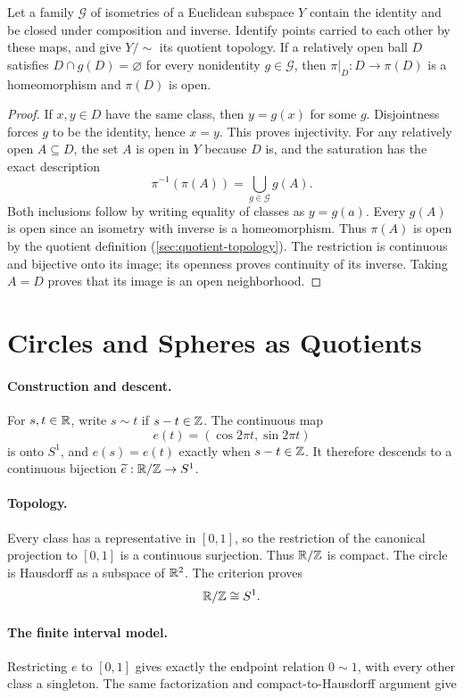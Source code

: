 \begin{lemma}
\label{lem:separated-quotient-neighborhood}
Let a family $\mathcal G$ of isometries of a Euclidean subspace $Y$
contain the identity and be closed under composition and inverse. Identify
points carried to each other by these maps, and give $Y/{\sim}$ its
quotient topology. If a relatively open ball $D$ satisfies
$D\cap g(D)=\varnothing$ for every nonidentity $g\in\mathcal G$, then
$\pi|_D:D\to\pi(D)$ is a homeomorphism and $\pi(D)$ is open.
\end{lemma}
\begin{proof}
If $x,y\in D$ have the same class, then $y=g(x)$ for some $g$.
Disjointness forces $g$ to be the identity, hence $x=y$. This proves
injectivity. For any relatively open $A\subseteq D$, the set $A$ is
open in $Y$ because $D$ is, and the saturation has the exact description
\[
\pi^{-1}(\pi(A))=\bigcup_{g\in\mathcal G}g(A).
\]
Both inclusions follow by writing equality of classes as $y=g(a)$.
Every $g(A)$ is open since an isometry with inverse is a homeomorphism.
Thus $\pi(A)$ is open by the quotient definition
(\cref{sec:quotient-topology}). The restriction is continuous and bijective
onto its image; its openness proves continuity of its inverse. Taking
$A=D$ proves that its image is an open neighborhood.
\end{proof}

\section{Circles and Spheres as Quotients}\label{sec:quotient-circle}
\paragraph{Construction and descent.}
For $s,t\in\mathbb{R}$, write $s\sim t$ if $s-t\in\mathbb{Z}$. The continuous map
\[
e(t)=(\cos2\pi t,\sin2\pi t)
\]
is onto $S^1$, and $e(s)=e(t)$ exactly when $s-t\in\mathbb{Z}$.
It therefore descends to a continuous bijection
$\widetilde e:\mathbb{R}/\mathbb{Z}\to S^1$.
\paragraph{Topology.}
Every class has a representative in $[0,1]$,
so the restriction of the canonical projection to $[0,1]$ is a continuous
surjection. Thus $\mathbb{R}/\mathbb{Z}$ is compact. The circle is Hausdorff as a
subspace of $\mathbb{R}^2$. The criterion proves
\[
\mathbb{R}/\mathbb{Z}\cong S^1.
\]
\paragraph{The finite interval model.}
Restricting $e$ to $[0,1]$ gives exactly the endpoint relation $0\sim1$,
with every other class a singleton. The same factorization and
compact-to-Hausdorff argument give


